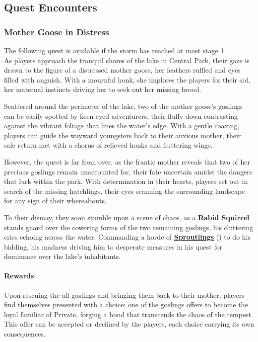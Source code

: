 \subsection*{Quest Encounters}
\subsubsection*{Mother Goose in Distress}
The following quest is available if the storm has reached at most stage 1.\\
As players approach the tranquil shores of the lake in Central Park, their gaze is drawn to the figure of a distressed mother goose, her feathers ruffled and eyes filled with anguish. With a mournful honk, she implores the players for their aid, her maternal instincts driving her to seek out her missing brood.

Scattered around the perimeter of the lake, two of the mother goose's goslings can be easily spotted by keen-eyed adventurers, their fluffy down contrasting against the vibrant foliage that lines the water's edge. With a gentle coaxing, players can guide the wayward youngsters back to their anxious mother, their safe return met with a chorus of relieved honks and fluttering wings.

However, the quest is far from over, as the frantic mother reveals that two of her precious goslings remain unaccounted for, their fate uncertain amidst the dangers that lurk within the park. With determination in their hearts, players set out in search of the missing hatchlings, their eyes scanning the surrounding landscape for any sign of their whereabouts.

To their dismay, they soon stumble upon a scene of chaos, as a \textbf{Rabid Squirrel} stands guard over the cowering forms of the two remaining goslings, his chittering cries echoing across the water. Commanding a horde of \hyperref[sec:Sproutling]{\textbf{Sproutlings}} () to do his bidding, his madness driving him to desperate measures in his quest for dominance over the lake's inhabitants.

\paragraph*{Rewards}
Upon rescuing the all goslings and bringing them back to their mother, players find themselves presented with a choice: one of the goslings offers to become the loyal familiar of Private, forging a bond that transcends the chaos of the tempest. This offer can be accepted or declined by the players, each choice carrying its own consequences.

